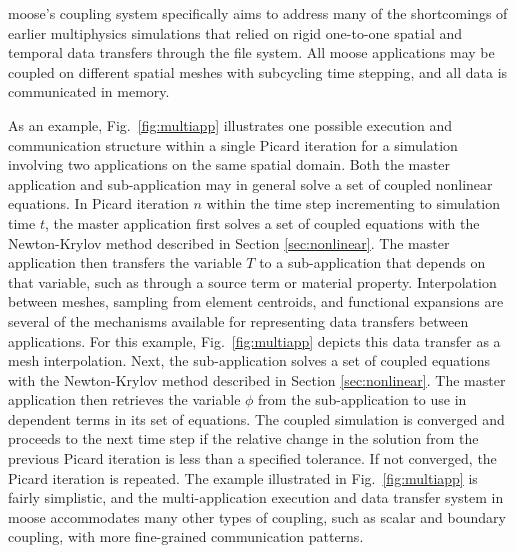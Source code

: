 \gls{moose}'s coupling system specifically aims to address many of the shortcomings of earlier multiphysics simulations that relied on rigid one-to-one spatial and temporal data transfers through the file system. All \gls{moose} applications may be coupled on different spatial meshes with subcycling time stepping, and all data is communicated in memory. 

As an example, Fig.\ \ref{fig:multiapp} illustrates one possible execution and communication structure within a single Picard iteration for a simulation involving two applications on the same spatial domain. Both the master application and sub-application may in general solve a set of coupled nonlinear equations. In Picard iteration \(n\) within the time step incrementing to simulation time \(t\), the master application first solves a set of coupled equations with the Newton-Krylov method described in Section \ref{sec:nonlinear}. The master application then transfers the variable \(T\) to a sub-application that depends on that variable, such as through a source term or material property. Interpolation between meshes, sampling from element centroids, and functional expansions are several of the mechanisms available for representing data transfers between applications. For this example, Fig.\ \ref{fig:multiapp} depicts this data transfer as a mesh interpolation. Next, the sub-application solves a set of coupled equations with the Newton-Krylov method described in Section \ref{sec:nonlinear}. The master application then retrieves the variable \(\phi\) from the sub-application to use in dependent terms in its set of equations. The coupled simulation is converged and proceeds to the next time step if the relative change in the solution from the previous Picard iteration is less than a specified tolerance. If not converged, the Picard iteration is repeated. The example illustrated in Fig.\ \ref{fig:multiapp} is fairly simplistic, and the multi-application execution and data transfer system in \gls{moose} accommodates many other types of coupling, such as scalar and boundary coupling, with more fine-grained communication patterns. 

